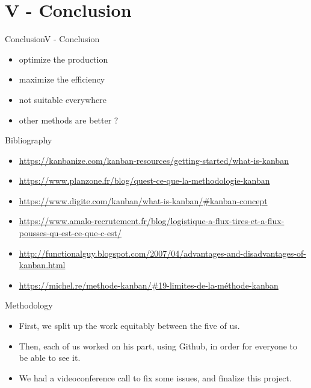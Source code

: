 \documentclass[10pt]{beamer}
\newcommand{\PV}{V - Conclusion}
\begin{document}
\section{\PV} 


\begin{frame}{Conclusion}{\PV}
    \begin{itemize}
        \item optimize the production
        \item maximize the efficiency
        \item not suitable everywhere
        \item other methods are better ?
    \end{itemize}
\end{frame}


\begin{frame}{Bibliography}
    \begin{itemize}
        \item \href{https://kanbanize.com/kanban-resources/getting-started/what-is-kanban}{https://kanbanize.com/kanban-resources/getting-started/what-is-kanban}
        \item \href{https://www.planzone.fr/blog/quest-ce-que-la-methodologie-kanban}{https://www.planzone.fr/blog/quest-ce-que-la-methodologie-kanban}
        \item \href{https://www.digite.com/kanban/what-is-kanban/\#kanban-concept}{https://www.digite.com/kanban/what-is-kanban/\#kanban-concept}
        \item \href{https://www.amalo-recrutement.fr/blog/logistique-a-flux-tires-et-a-flux-pousses-qu-est-ce-que-c-est/}{https://www.amalo-recrutement.fr/blog/logistique-a-flux-tires-et-a-flux-pousses-qu-est-ce-que-c-est/}
        \item \href{http://functionalguy.blogspot.com/2007/04/advantages-and-disadvantages-of-kanban.html}{http://functionalguy.blogspot.com/2007/04/advantages-and-disadvantages-of-kanban.html}
        \item \href{https://michel.re/methode-kanban/\#19-limites-de-la-méthode-kanban}{https://michel.re/methode-kanban/\#19-limites-de-la-méthode-kanban}
    \end{itemize}
\end{frame}


\begin{frame}{Methodology}
    \begin{itemize}
        \item First, we split up the work equitably between the five of us.
        \item Then, each of us worked on his part, using Github, in order for everyone to be able to see it.
        \item We had a videoconference call to fix some issues, and finalize this project.
    \end{itemize}
\end{frame}
\end{document}
